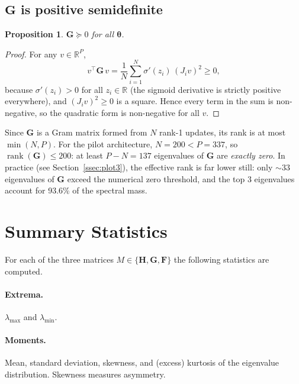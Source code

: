 \documentclass[12pt,a4paper]{article}
\newtheorem{proposition}{Proposition}
\newcommand{\R}{\mathbb{R}}
\newcommand{\rank}{\operatorname{rank}}
\newcommand{\btheta}{\boldsymbol{\theta}}
\newcommand{\bH}{\mathbf{H}}
\newcommand{\bG}{\mathbf{G}}
\newcommand{\bF}{\mathbf{F}}
\newcommand{\sigmoid}{\sigma}
\begin{document}
\subsection{$\bG$ is positive semidefinite}
\label{ssec:gn_psd}

\begin{proposition}
  $\bG \succeq 0$ for all $\btheta$.
\end{proposition}

\begin{proof}
For any $v \in \R^P$,
\begin{equation}
  v^\top \bG\, v
  = \frac{1}{N}\sum_{i=1}^N \sigmoid'(z_i)\, (J_i v)^2
  \geq 0,
\end{equation}
because $\sigmoid'(z_i) > 0$ for all $z_i \in \R$ (the sigmoid derivative is
strictly positive everywhere), and $(J_i v)^2 \geq 0$ is a square.
Hence every term in the sum is non-negative, so the quadratic form is
non-negative for all $v$.
\end{proof}

Since $\bG$ is a Gram matrix formed from $N$ rank-1 updates, its rank is at
most $\min(N, P)$.
For the pilot architecture, $N = 200 < P = 337$, so
$\rank(\bG) \leq 200$: at least $P - N = 137$ eigenvalues of $\bG$ are
\emph{exactly zero}.
In practice (see Section~\ref{ssec:plot3}), the effective rank is far lower
still: only $\sim\!33$ eigenvalues of $\bG$ exceed the numerical zero
threshold, and the top 3 eigenvalues account for 93.6\% of the spectral mass.


\section{Summary Statistics}
\label{sec:stats}

For each of the three matrices $M \in \{\bH, \bG, \bF\}$ the following statistics are
computed.

\paragraph{Extrema.}
$\lambda_{\max}$ and $\lambda_{\min}$.

\paragraph{Moments.}
Mean, standard deviation, skewness, and (excess) kurtosis of the eigenvalue
distribution.  Skewness measures asymmetry.
\end{document}

